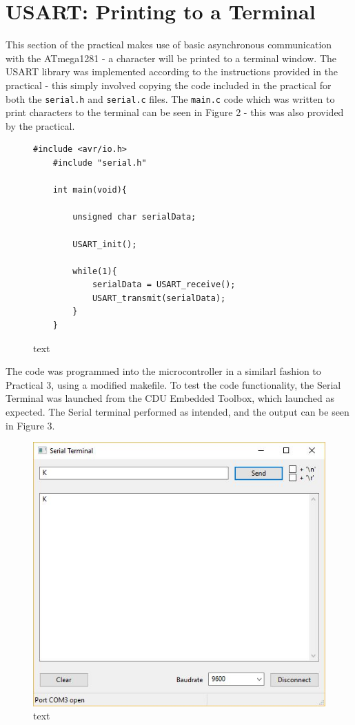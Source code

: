 \documentclass[a4paper]{article}
\begin{document}
\section{USART: Printing to a Terminal}
This section of the practical makes use of basic asynchronous communication with the ATmega1281 - a character will be printed to a terminal window. The USART library was implemented according to the instructions provided in the practical - this simply involved copying the code included in the practical for both the \verb|serial.h| and \verb|serial.c| files. The \verb|main.c| code which was written to print characters to the terminal can be seen in Figure 2 - this was also provided by the practical.

\begin{figure}[h]
	\begin{lstlisting}[style=CStyle]
	#include <avr/io.h>
	#include "serial.h"
	
	int main(void){
	
		unsigned char serialData;
	
		USART_init();
	
		while(1){
			serialData = USART_receive();
			USART_transmit(serialData);
		}
	}
	\end{lstlisting}
	\caption{text}
\end{figure}

The code was programmed into the microcontroller in a similarl fashion to Practical 3, using a modified makefile. To test the code functionality, the Serial Terminal was launched from the CDU Embedded Toolbox, which launched as expected. The Serial terminal performed as intended, and the output can be seen in Figure 3.
\vspace{0.5cm}
\begin{figure}[h]
	\centering
	\includegraphics[scale=0.6]{fig2}
	\caption{text}
\end{figure}
\end{document}
